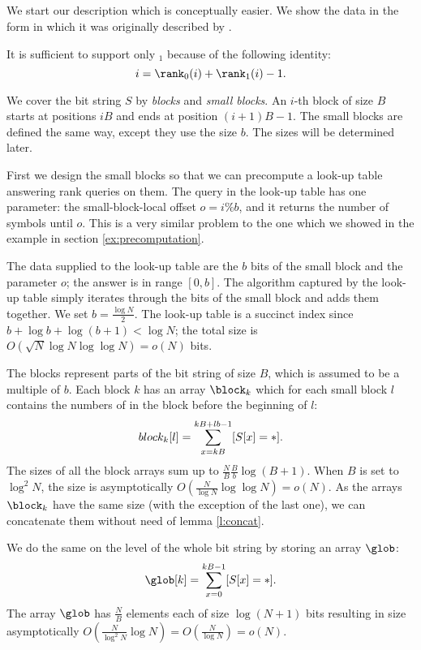 \subsection{\rank}\label{ss:rank}

We start our description \rank{} which is conceptually easier.
We show the data in the form in which it was originally described by \cite{jacobson1988succinct}.

It is sufficient to support only \rank$_1$ because of the following identity:
$$ i = \rank_0(i) + \rank_1(i) - 1. $$

\bigbreak

We cover the bit string $S$ by \emph{blocks} and \emph{small blocks}.
An $i$-th block of size $B$ starts at positions $i B$ and ends at position $(i + 1) B - 1$.
The small blocks are defined the same way, except they use the size $b$.
The sizes will be determined later.

First we design the small blocks so that we can precompute a look-up table \rank{} answering rank queries on them.
The query in the look-up table has one parameter: the small-block-local offset $o = i \% b$, and it returns the number of symbols \ph{} until $o$.
This is a very similar problem to the one which we showed in the example in section \ref{ex:precomputation}.

The data supplied to the look-up table are the $b$ bits of the small block and the parameter $o$; the answer is in range $[0, b]$.
The algorithm captured by the look-up table simply iterates through the bits of the small block and adds them together.
We set $b = \frac{\log N}{2}$.
The look-up table is a succinct index since $b + \log b + \log (b + 1) < \log N$; the total size is $O(\sqrt{N} \log N \log \log N) = o(N)$ bits.

The blocks represent parts of the bit string of size $B$, which is assumed to be a multiple of $b$.
Each block $k$ has an array $\block_k$ which for each small block $l$ contains the numbers of \ph{} in the block before the beginning of $l$:
$$ block_k[l] = \sum_{x = k B}^{k B + l b - 1} [S[x] = \ph]. $$
The sizes of all the block arrays sum up to $\frac{N}{B} \frac{B}{b} \log (B + 1)$.
When $B$ is set to $\log^2 N$, the size is asymptotically $O\left(\frac{N}{\log N} \log \log N\right) = o(N)$.
As the arrays $\block_k$ have the same size (with the exception of the last one), we can concatenate them without need of lemma \ref{l:concat}.

We do the same on the level of the whole bit string by storing an array $\glob$:
$$ \glob[k] = \sum_{x = 0}^{k B - 1} [S[x] = \ph]. $$
The array $\glob$ has $\frac{N}{B}$ elements each of size $\log (N+1)$ bits resulting in size asymptotically $O\left(\frac{N}{\log^2 N} \log{N}\right) = O\left(\frac{N}{\log N}\right) = o(N)$.

